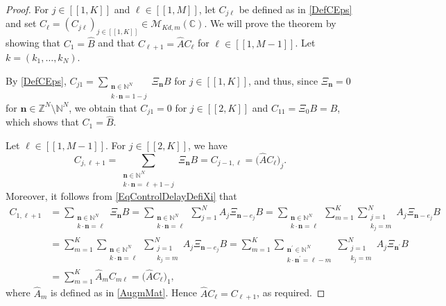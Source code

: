 \documentclass[10pt]{amsart}
\newcommand{\bn}{\boldsymbol{n}}
\newcommand{\llbracket}{[\![}
\newcommand{\rrbracket}{]\!]}
\theoremstyle{plain}
\theoremstyle{definition}
\begin{document}
\begin{proof}
For $j \in \llbracket 1, K\rrbracket$ and $\ell \in \llbracket 1, M\rrbracket$, let $C_{j\ell}$ be defined as in \eqref{DefCEps} and set $C_\ell = \left(C_{j\ell}\right)_{j \in \llbracket 1, K\rrbracket} \in \mathcal M_{Kd, m}(\mathbb C)$. We will prove the theorem by showing that $C_1 = \widehat B$ and that $C_{\ell + 1} = \widehat A C_\ell$ for $\ell \in \llbracket 1, M-1\rrbracket$. Let $k = (k_1, \dots, k_N)$.

By \eqref{DefCEps}, $C_{j1} = \sum_{\substack{\bn \in \mathbb N^N \\ k \cdot \bn = 1 - j}} \Xi_{\bn} B$ for $j \in \llbracket 1, K\rrbracket$, and thus, since $\Xi_{\bn} = 0$ for $\bn \in \mathbb Z^N \setminus \mathbb N^N$, we obtain that $C_{j1} = 0$ for $j \in \llbracket 2, K\rrbracket$ and $C_{11} = \Xi_{0} B = B$, which shows that $C_1 = \widehat B$.

Let $\ell \in \llbracket 1, M-1\rrbracket$. For $j \in \llbracket 2, K\rrbracket$, we have
\[
C_{j, \ell + 1} = \sum_{\substack{\bn \in \mathbb N^N \\ k \cdot \bn = \ell + 1 - j}} \Xi_{\bn} B = C_{j-1, \ell} =\bigl(\widehat A C_{\ell}\bigr)_j.
\]
Moreover, it follows from \eqref{EqControlDelayDefiXi} that
\begin{align*}
C_{1, \ell + 1} & = \sum_{\substack{\bn \in \mathbb N^N \\ k \cdot \bn = \ell}} \Xi_{\bn} B = \sum_{\substack{\bn \in \mathbb N^N \\ k \cdot \bn = \ell}} \sum_{j=1}^N A_j \Xi_{\bn - e_j} B {} = \sum_{\substack{\bn \in \mathbb N^N \\ k \cdot \bn = \ell}} \sum_{m=1}^K \sum_{\substack{j=1 \\ k_j = m}}^N A_j \Xi_{\bn - e_j} B  \\
& = \sum_{m=1}^K \sum_{\substack{\bn \in \mathbb N^N \\ k \cdot \bn = \ell}} \sum_{\substack{j=1 \\ k_j = m}}^N A_j \Xi_{\bn - e_j} B = \sum_{m=1}^K \sum_{\substack{\bn^\prime \in \mathbb N^N \\ k \cdot \bn^\prime = \ell - m}} \sum_{\substack{j=1 \\ k_j = m}}^N A_j \Xi_{\bn^\prime} B\\& = \sum_{m=1}^K \widehat A_m C_{m\ell} = \bigl(\widehat A C_{\ell}\bigr)_1,
\end{align*}
where $\widehat A_m$ is defined as in \eqref{AugmMat}. Hence $\widehat A C_\ell = C_{\ell + 1}$, as required.
\end{proof}
\end{document}
